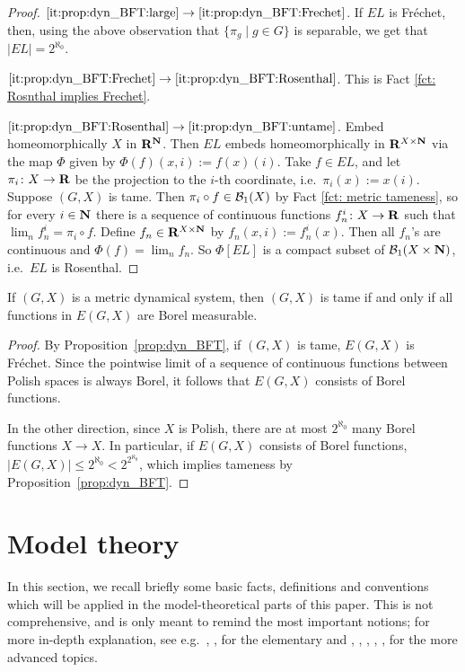 \begin{proof}
		$\ref{it:prop:dyn_BFT:large} \rightarrow \ref{it:prop:dyn_BFT:Frechet}$. If $EL$ is Fréchet, then, using the above observation that $\{\pi_g \mid g \in G\}$ is separable, we get that $|EL| = 2^{\aleph_0}$.
		
		$\ref{it:prop:dyn_BFT:Frechet} \rightarrow \ref{it:prop:dyn_BFT:Rosenthal}$. This is Fact \ref{fct: Rosnthal implies Frechet}.
		
		$\ref{it:prop:dyn_BFT:Rosenthal} \rightarrow \ref{it:prop:dyn_BFT:untame}$. Embed homeomorphically $X$ in ${\mathbf{R}}^{\mathbf{N}}$. Then $EL$ embeds homeomorphically in ${\mathbf{R}}^{X \times {\mathbf{N}}}$ via the map $\Phi$ given by $\Phi(f)(x,i):=f(x)(i)$. Take $f \in EL$, and let $\pi_i \colon X \to {\mathbf{R}}$ be the projection to the $i$-th coordinate, i.e.\ $\pi_i(x):=x(i)$. Suppose $(G,X)$ is tame. Then $\pi_i \circ f \in {\mathcal B}_1(X)$ by Fact \ref{fct: metric tameness}, so for every $i \in {\mathbf{N}}$ there is a sequence of continuous functions $f^i_n \colon X \to {\mathbf{R}}$ such that $\lim_n f^i_n = \pi_i \circ f$. Define $f_n \in {\mathbf{R}}^{X \times {\mathbf{N}}}$ by $f_n(x,i) := f^i_n(x)$. Then all $f_n$'s are continuous and $\Phi(f)= \lim_n f_n$.
		So $\Phi[EL]$ is a compact subset of ${\mathcal B}_1(X \times {\mathbf{N}})$, i.e.\ $EL$ is Rosenthal.
	\end{proof}
	
	
	\begin{fct}
		\label{fct:tame_borel}
		If $(G,X)$ is a metric dynamical system, then $(G,X)$ is tame if and only if all functions in $E(G,X)$ are Borel measurable.
	\end{fct}
	\begin{proof}
		By Proposition~\ref{prop:dyn_BFT}, if $(G,X)$ is tame, $E(G,X)$ is Fréchet. Since the pointwise limit of a sequence of continuous functions between Polish spaces is always Borel, it follows that $E(G,X)$ consists of Borel functions.
		
		In the other direction, since $X$ is Polish, there are at most $2^{\aleph_0}$ many Borel functions $X\to X$. In particular, if $E(G,X)$ consists of Borel functions, $\lvert E(G,X)\rvert\leq 2^{\aleph_0}<2^{2^{\aleph_0}}$, which implies tameness by Proposition~\ref{prop:dyn_BFT}.
	\end{proof}
	
	
	\section{Model theory}
	In this section, we recall briefly some basic facts, definitions and conventions which will be applied in the model-theoretical parts of this paper. This is not comprehensive, and is only meant to remind the most important notions; for more in-depth explanation, see e.g.\ \cite{Hod93}, \cite{marker}, \cite{TZ12} for the elementary and \cite{CLPZ01}, \cite{GiNe08}, \cite{KP97}, \cite{KPS13}, \cite{LaPi}, \cite{Zie02} for the more advanced topics.
